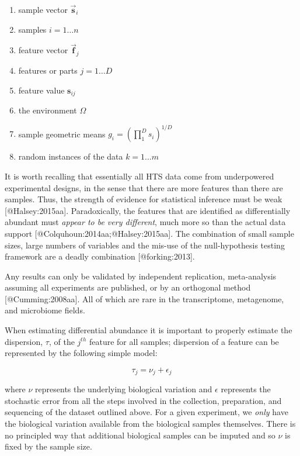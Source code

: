 \documentclass[
  onecolumn]{article}
\providecommand{\tightlist}{%
  \setlength{\itemsep}{0pt}\setlength{\parskip}{0pt}}
\newcommand{\vect}[1]{\vec{\textbf{#1}}}
\begin{document}
\begin{enumerate}
\def\labelenumi{\arabic{enumi}.}
\tightlist
\item
  sample vector \(\vect{s}_i\)
\item
  samples \(i=1 \ldots n\)
\item
  feature vector \(\vect{f}_j\)
\item
  features or parts \(j=1 \ldots D\)
\item
  feature value \(\textbf{s}_{ij}\)
\item
  the environment \(\Omega\)
\item
  sample geometric means \(g_i= ( \prod_{1}^{D} s_i )^{1/D}\)
\item
  random instances of the data \(k=1 \ldots m\)
\end{enumerate}

It is worth recalling that essentially all HTS data come from underpowered experimental designs, in the sense that there are more features than there are samples. Thus, the strength of evidence for statistical inference must be weak {[}@Halsey:2015aa{]}. Paradoxically, the features that are identified as differentially abundant must \emph{appear to be very different}, much more so than the actual data support {[}@Colquhoun:2014aa;@Halsey:2015aa{]}. The combination of small sample sizes, large numbers of variables and the mis-use of the null-hypothesis testing framework are a deadly combination {[}@forking:2013{]}.

Any results can only be validated by independent replication, meta-analysis assuming all experiments are published, or by an orthogonal method {[}@Cumming:2008aa{]}. All of which are rare in the transcriptome, metagenome, and microbiome fields.

When estimating differential abundance it is important to properly estimate the dispersion, \(\tau\), of the \(j^{th}\) feature for all samples; dispersion of a feature can be represented by the following simple model:

\begin{equation}
    \tau_{j} = \nu_j + \epsilon_j
\label{eq:dispersion}
\end{equation}

where \(\nu\) represents the underlying biological variation and \(\epsilon\) represents the stochastic error from all the steps involved in the collection, preparation, and sequencing of the dataset outlined above. For a given experiment, we \emph{only} have the biological variation available from the biological samples themselves. There is no principled way that additional biological samples can be imputed and so \(\nu\) is fixed by the sample size.
\end{document}
